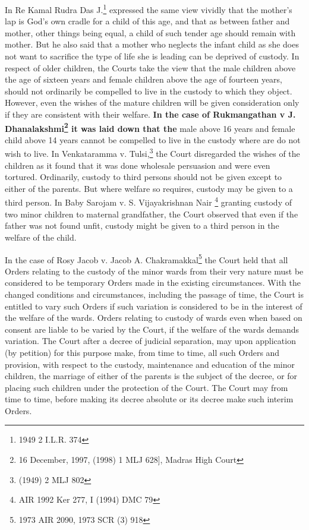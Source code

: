 \begin{multicols}{2}
\noi
In Re Kamal Rudra Das J.\footnote{1949 2 I.L.R. 374} expressed the same view vividly that the mother's lap is God's own
cradle for a child of this age, and that as between father and mother, other things being equal, a
child of such tender age should remain with mother. But he also said that a mother who neglects
the infant child as she does not want to sacrifice the type of life she is leading can be deprived of
custody. In respect of older children, the Courts take the view that the male children above the
age of sixteen years and female children above the age of fourteen years, should not ordinarily be
compelled to live in the custody to which they object. However, even the wishes of the mature
children will be given consideration only if they are consistent with their welfare. \textbf{In the case
of Rukmangathan v J. Dhanalakshmi\footnote{16 December, 1997, (1998) 1 MLJ 628], Madras High Court} it was laid down that the} male above 16 years and female child above 14 years cannot be compelled to live in the custody where are do not wish to live. In Venkataramma v. Tulsi,\footnote{(1949) 2 MLJ 802} the Court disregarded the wishes of the children as it found that it was done wholesale persuasion and were even tortured. Ordinarily,
custody to third persons should not be given except to either of the parents. But where welfare so
requires, custody may be given to a third person. In Baby Sarojam v. S. Vijayakrishnan Nair \footnote{AIR 1992 Ker 277, I (1994) DMC 79} granting custody of two minor children to maternal grandfather, the Court observed that even if the father was not found unfit, custody might be given to a third person in the welfare of the child.

\noi
In the case of Rosy Jacob v. Jacob A. Chakramakkal\footnote{1973 AIR 2090, 1973 SCR (3) 918} the Court held that all Orders relating to the custody of the minor wards from their very nature must be considered to be temporary Orders made in the existing circumstances. With the changed conditions and circumstances, including the passage of time, the Court is entitled to vary such Orders if such variation is considered to be in the interest of the welfare of the wards. Orders relating to custody of wards even when based on consent are liable to be varied by the Court, if the welfare of the wards demands variation. The Court after a decree of judicial separation, may upon application (by petition) for this purpose make, from time to time, all such Orders and provision, with respect to the custody, maintenance and education of the minor children, the marriage of either of the parents is the subject of the decree, or for placing such children under the protection of the Court. The Court may from time
to time, before making its decree absolute or its decree make such interim Orders.


\end{multicols}
